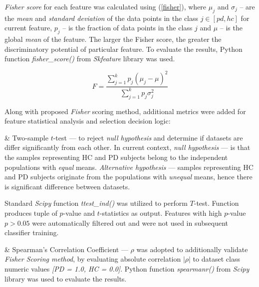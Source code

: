 \textit{Fisher score} for each feature was calculated using (\ref{fisher}), where $\mu_j$ and $\sigma_j$ -- are the \textit{mean} and \textit{standard deviation} of the data points in the class $j \in [pd, hc]$ for current feature, $p_j$ -- is the fraction of data points in the class $j$ and $\mu$ -- is the global \textit{mean} of the feature. The larger the Fisher score, the greater the discriminatory potential of particular feature. To evaluate the results, Python function \textit{fisher\_score()} from \textit{Skfeature} library was used.

\begin{equation}
\label{fisher}
  F = \frac{\sum_{j=1}^{k} p_j(\mu_j - \mu)^2}{\sum_{j=1}^{k} p_j\sigma_j^2}
\end{equation}

Along with proposed \textit{Fisher} scoring method, additional metrics were added for feature statistical analysis and selection decision logic:

\begin{easylist}

& Two-sample $t$-test --- to reject \textit{null hypothesis} and determine if datasets are  differ significantly from each other. In current context, \textit{null hypothesis} --- is that the samples representing HC and PD subjects belong to the independent populations with \textit{equal} means. \textit{Alternative hypothesis} --- samples representing HC and PD subjects originate from the populations with \textit{unequal} means, hence there is significant difference between datasets. 

Standard \textit{Scipy} function \textit{ttest\_ind()} was utilized to perform $T$-test. Function produces tuple of $p$-value and $t$-statistics as output. Features with high $p$-value $p > 0.05$ were automatically filtered out and were not used in subsequent classifier training.

& Spearman's Correlation Coefficient --- $\rho$ was adopted to additionally validate \textit{Fisher Scoring method}, by evaluating absolute correlation $|\rho|$ to dataset class numeric values \textit{[PD = 1.0, HC = 0.0]}. Python function \textit{spearmanr()} from \textit{Scipy} library was used to evaluate the results.

\end{easylist}



